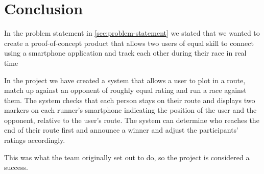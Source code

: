 \section{Conclusion}
In the problem statement in \autoref{sec:problem-statement} we stated that we wanted to create a proof-of-concept product that allows two users of equal skill to connect using a smartphone application and track each other during their race in real time 

In the project we have created a system that allows a user to plot in a route, match up against an opponent of roughly equal rating and run a race against them. The system checks that each person stays on their route and displays two markers on each runner's smartphone indicating the position of the user and the opponent, relative to the user's route. The system can determine who reaches the end of their route first and announce a winner and adjust the participants' ratings accordingly. 

This was what the team originally set out to do, so the project is considered a success.